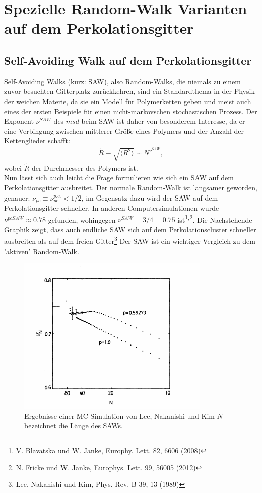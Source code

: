 \documentclass[a4paper, 12pt]{report}
\begin{document}
\newpage
\section{Spezielle Random-Walk Varianten auf dem Perkolationsgitter}


\subsection{Self-Avoiding Walk auf dem Perkolationsgitter}
Self-Avoiding Walks (kurz: SAW), also Random-Walks, die niemals zu einem zuvor besuchten Gitterplatz zurückkehren, sind ein Standardthema in der Physik der weichen Materie, da sie ein Modell für Polymerketten geben und meist auch eines der ersten Beispiele für einen nicht-markovschen stochastischen Prozess. Der Exponent $\nu^{SAW}$ des $msd$ beim SAW ist daher von besonderem Interesse, da er eine Verbingung zwischen mittlerer Größe eines Polymers und der Anzahl der Kettenglieder schafft:
\begin{align*}
\tilde R \equiv \sqrt{\langle R^2 \rangle} \sim N^{\nu^{SAW}},
\end{align*} 
wobei $\tilde R$ der Durchmesser des Polymers ist.
\\
Nun lässt sich auch leicht die Frage formulieren wie sich ein SAW auf dem Perkolationsgitter ausbreitet. Der normale Random-Walk ist langsamer geworden, genauer: $\nu_{pc} \equiv \nu_{pc}^{p.c.} < 1/2$, im Gegensatz dazu wird der SAW auf dem Perkolationsgitter schneller. In anderen Computersimulationen wurde $\nu^{pcSAW} \approx 0.78$ gefunden, wohingegen $\nu^{SAW}=3/4=0.75$ ist\footnote[5]{V. Blavatska und W. Janke, Europhy. Lett. 82, 6606 (2008)}$^,$\footnote[6]{N. Fricke und W. Janke, Europhys. Lett. 99, 56005 (2012)}. Die Nachstehende Graphik zeigt, dass auch endliche SAW sich auf dem
Perkolationscluster schneller ausbreiten als auf dem freien Gitter\footnote[7]{Lee, Nakanishi und Kim, Phys. Rev. B 39, 13 (1989)} Der SAW ist ein wichtiger Vergleich zu dem 'aktiven' Random-Walk.
\begin{figure}[h!]
	\centering
	\includegraphics[scale=1.2]{saw.png}
	\caption{Ergebnisse einer MC-Simulation von Lee, Nakanishi und Kim \break $N$ bezeichnet die Länge des SAWs.}
\end{figure}
\end{document}
